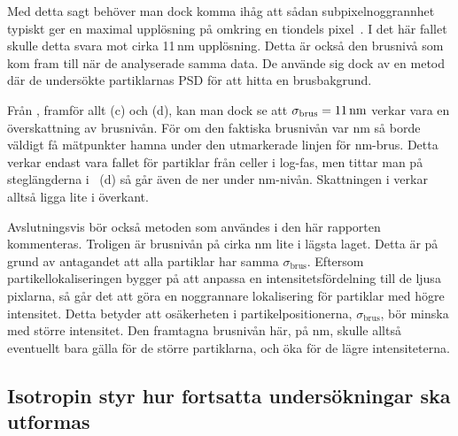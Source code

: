 Med detta sagt behöver man dock komma ihåg att sådan subpixelnoggrannhet typiskt ger en maximal upplösning på omkring en tiondels pixel~\cite{Saunter2010}. I det här fallet skulle detta svara mot cirka 11\,nm upplösning. Detta är också den brusnivå som \cite{Midtveldt_etal2016} kom fram till när de analyserade samma data. De använde sig dock av en metod där de undersökte partiklarnas PSD för att hitta en brusbakgrund. 

Från , framför allt (c) och (d), kan man dock se att $\sigma_\text{brus}=\unit[11]{nm}$ verkar vara en överskattning av brusnivån. För om den faktiska brusnivån var \unit[11]{nm} så borde väldigt få mätpunkter hamna under den utmarkerade linjen för \unit[11]{nm}-brus. Detta verkar endast vara fallet för partiklar från celler i log-fas, men tittar man på steglängderna i ~(d) så går även de ner under \unit[11]{nm}-nivån. Skattningen i \cite{Midtveldt_etal2016} verkar alltså ligga lite i överkant.\footnotemark{}


Avslutningsvis bör också metoden som användes i den här rapporten kommenteras. Troligen är brusnivån på cirka \unit[5]{nm} lite i lägsta laget. Detta är på grund av antagandet att alla partiklar har samma $\sigma_\text{brus}$. Eftersom partikellokaliseringen bygger på att anpassa en intensitetsfördelning till de ljusa pixlarna, så går det att göra en noggrannare lokalisering för partiklar med högre intensitet. Detta betyder att osäkerheten i partikelpositionerna, $\sigma_\text{brus}$, bör minska med större intensitet. Den framtagna brusnivån här, på \unit[5]{nm}, skulle alltså eventuellt bara gälla för de större partiklarna, och öka för de lägre intensiteterna.



\subsection{Isotropin styr hur fortsatta undersökningar ska utformas}

